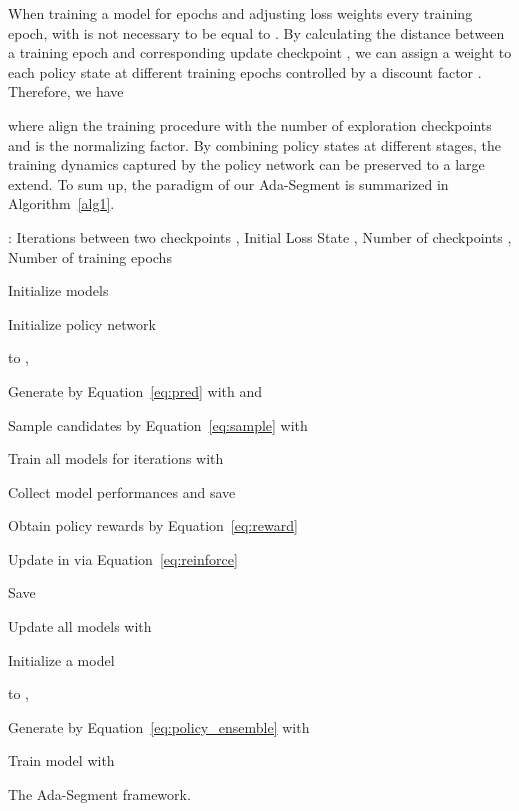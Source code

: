 \documentclass[letterpaper]{article} \usepackage{aaai21}  \usepackage{times}  \usepackage{helvet} \usepackage{courier}  \usepackage[hyphens]{url}  \usepackage{graphicx} \urlstyle{rm} \def\UrlFont{\rm}  \usepackage{natbib}  \usepackage{caption} \frenchspacing  \setlength{\pdfpagewidth}{8.5in}  \setlength{\pdfpageheight}{11in}
\begin{document}
When training a model  for  epochs and adjusting loss weights every training epoch, 
 with  is not necessary to be equal to . 
By calculating the distance between a training epoch  and corresponding update checkpoint , 
 we can assign a weight to each policy state at different training epochs controlled by 
 a discount factor . Therefore, we have 


 
where  align the training procedure with the number of exploration checkpoints and
 is the normalizing factor.
 By combining policy states at different stages, the training dynamics
 captured by the policy network can be preserved to a large extend.
To sum up, the paradigm of our Ada-Segment is summarized in Algorithm~\ref{alg1}.  
  
\begin{algorithm}
: Iterations between two checkpoints , Initial Loss State , 
  Number of checkpoints , Number of training epochs 
  
  \quad Initialize  models 

  \quad Initialize policy network 







  \quad 

  \quad   to , 
  
  \quad \quad Generate  by Equation~\ref{eq:pred} 
  with  and 

  \quad \quad Sample  candidates by 
  Equation~\ref{eq:sample} with 
  
  \quad \quad Train all models for  iterations with 

  \quad \quad Collect model performances  and save 

  \quad \quad Obtain policy rewards by Equation~\ref{eq:reward}
  
  \quad \quad Update  in  via Equation~\ref{eq:reinforce}

  \quad \quad Save 
  
  \quad \quad Update all models 
with
  



















  \quad 

  \quad Initialize a model 

  \quad   to , 

  \quad \quad Generate  by Equation~\ref{eq:policy_ensemble} with 

  \quad \quad Train model  with 

  \quad 
  
   
  \caption{The Ada-Segment framework. }
  \label{alg1}
\end{algorithm}
\end{document}
